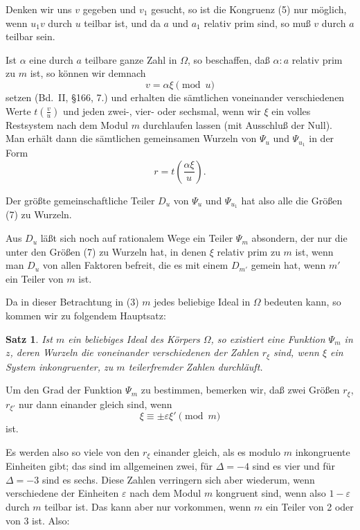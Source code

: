 \documentclass[12pt,a4paper]{article}
\newtheorem*{satz}{Satz}
\begin{document}
Denken wir uns $v$ gegeben und $v_1$ gesucht, so ist die Kongruenz (5) nur m\"oglich, wenn $u_1v$ durch $u$ teilbar ist, und da $a$ und $a_1$ relativ prim sind, so mu\ss{} $v$ durch $a$ teilbar sein.

Ist $\alpha$ eine durch $a$ teilbare ganze Zahl in $\Omega$, so beschaffen, da\ss{} $\alpha:a$ relativ prim zu $m$ ist, so k\"onnen wir demnach
\begin{equation}v = \alpha \xi \pmod{u}\end{equation}
setzen (Bd.~II, \S 166, 7.) und erhalten die s\"amtlichen voneinander verschiedenen Werte $t\left(\frac{v}{u}\right)$ und jeden zwei-, vier- oder sechsmal, wenn wir $\xi$ ein volles Restsystem nach dem Modul $m$ durchlaufen lassen (mit Ausschlu\ss{} der Null). Man erh\"alt dann die s\"amtlichen gemeinsamen Wurzeln von $\Psi_u$ und $\Psi_{u_1}$ in der Form
\begin{equation}r = t\left(\frac{\alpha \xi}{u}\right).\end{equation}

Der gr\"o\ss{}te gemeinschaftliche Teiler $D_u$ von $\Psi_u$ und $\Psi_{u_1}$ hat also alle die Gr\"o\ss{}en (7) zu Wurzeln.

Aus $D_u$ l\"a\ss{}t sich noch auf rationalem Wege ein Teiler $\Psi_m$ absondern, der nur die unter den Gr\"o\ss{}en (7) zu Wurzeln hat, in denen $\xi$ relativ prim zu $m$ ist, wenn man $D_u$ von allen Faktoren befreit, die es mit einem $D_{m'}$ gemein hat, wenn $m'$ ein Teiler von $m$ ist.

Da in dieser Betrachtung in (3) $m$ jedes beliebige Ideal in $\Omega$ bedeuten kann, so kommen wir zu folgendem Hauptsatz:

\begin{satz}
Ist $m$ ein beliebiges Ideal des K\"orpers $\Omega$, so existiert eine Funktion $\Psi_m$ in $z$, deren Wurzeln die voneinander verschiedenen der Zahlen $r_\xi$ sind, wenn $\xi$ ein System inkongruenter, zu $m$ teilerfremder Zahlen durchl\"auft.
\end{satz}

Um den Grad der Funktion $\Psi_m$ zu bestimmen, bemerken wir, da\ss{} zwei Gr\"o\ss{}en $r_\xi$, $r_{\xi'}$ nur dann einander gleich sind, wenn
\[\xi \equiv \pm \varepsilon \xi' \pmod{m}\]
ist.

Es werden also so viele von den $r_\xi$ einander gleich, als es modulo $m$ inkongruente Einheiten gibt; das sind im allgemeinen zwei, f\"ur $\Delta = -4$ sind es vier und f\"ur $\Delta = -3$ sind es sechs. Diese Zahlen verringern sich aber wiederum, wenn verschiedene der Einheiten $\varepsilon$ nach dem Modul $m$ kongruent sind, wenn also $1 - \varepsilon$ durch $m$ teilbar ist. Das kann aber nur vorkommen, wenn $m$ ein Teiler von 2 oder von 3 ist. Also:
\end{document}

